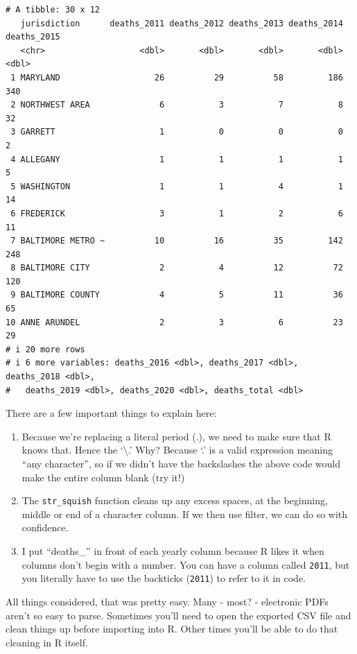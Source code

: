 \documentclass[
  letterpaper,
  DIV=11,
  numbers=noendperiod]{scrreprt}
\providecommand{\tightlist}{%
  \setlength{\itemsep}{0pt}\setlength{\parskip}{0pt}}\usepackage{longtable,booktabs,array}
\begin{document}
\begin{verbatim}
# A tibble: 30 x 12
   jurisdiction      deaths_2011 deaths_2012 deaths_2013 deaths_2014 deaths_2015
   <chr>                   <dbl>       <dbl>       <dbl>       <dbl>       <dbl>
 1 MARYLAND                   26          29          58         186         340
 2 NORTHWEST AREA              6           3           7           8          32
 3 GARRETT                     1           0           0           0           2
 4 ALLEGANY                    1           1           1           1           5
 5 WASHINGTON                  1           1           4           1          14
 6 FREDERICK                   3           1           2           6          11
 7 BALTIMORE METRO ~          10          16          35         142         248
 8 BALTIMORE CITY              2           4          12          72         120
 9 BALTIMORE COUNTY            4           5          11          36          65
10 ANNE ARUNDEL                2           3           6          23          29
# i 20 more rows
# i 6 more variables: deaths_2016 <dbl>, deaths_2017 <dbl>, deaths_2018 <dbl>,
#   deaths_2019 <dbl>, deaths_2020 <dbl>, deaths_total <dbl>
\end{verbatim}

There are a few important things to explain here:

\begin{enumerate}
\def\labelenumi{\arabic{enumi}.}
\tightlist
\item
  Because we're replacing a literal period (.), we need to make sure
  that R knows that. Hence the `\textbackslash.' Why? Because `.' is a
  valid expression meaning ``any character'', so if we didn't have the
  backslashes the above code would make the entire column blank (try
  it!)
\item
  The \texttt{str\_squish} function cleans up any excess spaces, at the
  beginning, middle or end of a character column. If we then use filter,
  we can do so with confidence.
\item
  I put ``deaths\_'' in front of each yearly column because R likes it
  when columns don't begin with a number. You can have a column called
  \texttt{2011}, but you literally have to use the backticks
  (\texttt{2011}) to refer to it in code.
\end{enumerate}

All things considered, that was pretty easy. Many - most? - electronic
PDFs aren't so easy to parse. Sometimes you'll need to open the exported
CSV file and clean things up before importing into R. Other times you'll
be able to do that cleaning in R itself.
\end{document}
